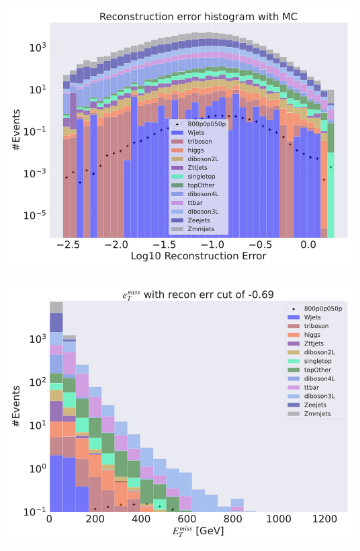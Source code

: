 \begin{figure}[H]
    \centering
    \begin{subfigure}{.40\textwidth}
        \includegraphics[width=\textwidth]{Figures/VAE_testing/small/3lep/b_data_recon_big_rm3_feats_sig_800p0p050p.pdf}
        \caption{ }
        \label{fig:VAE_3lep_small_800_2}
    \end{subfigure}
    \hfill
    \begin{subfigure}{.40\textwidth}
        \includegraphics[width=\textwidth]{Figures/VAE_testing/small/3lep/b_data_recon_big_rm3_feats_sig_800p0p050p_etmiss_recon_errcut_-0.69.pdf}
        \caption{}
        \label{fig:VAE_3lep_small_etmiss_800_2}
    \end{subfigure}

\end{figure}
